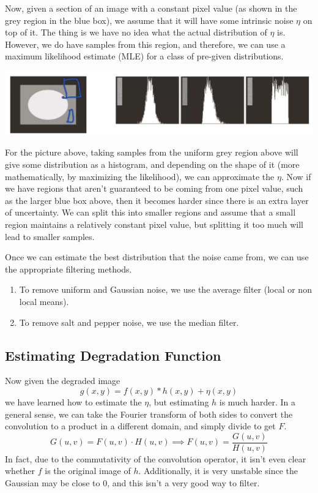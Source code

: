 \documentclass{article}
\begin{document}
    Now, given a section of an image with a constant pixel value (as shown in the grey region in the blue box), we assume that it will have some intrinsic noise $\eta$ on top of it. The thing is we have no idea what the actual distribution of $\eta$ is. However, we do have samples from this region, and therefore, we can use a maximum likelihood estimate (MLE) for a class of pre-given distributions. 
    \begin{center}
        \includegraphics[scale=0.2]{img/hist_estimate.png}
    \end{center}
    For the picture above, taking samples from the uniform grey region above will give some distribution as a histogram, and depending on the shape of it (more mathematically, by maximizing the likelihood), we can approximate the $\eta$. Now if we have regions that aren't guaranteed to be coming from one pixel value, such as the larger blue box above, then it becomes harder since there is an extra layer of uncertainty. We can split this into smaller regions and assume that a small region maintains a relatively constant pixel value, but splitting it too much will lead to smaller samples. 

    Once we can estimate the best distribution that the noise came from, we can use the appropriate filtering methods. 
    \begin{enumerate}
        \item To remove uniform and Gaussian noise, we use the average filter (local or non local means). 
        \item To remove salt and pepper noise, we use the median filter. 
    \end{enumerate}

  \subsection{Estimating Degradation Function}

    Now given the degraded image 
    \[g(x, y) = f(x, y) \ast h(x, y) + \eta(x, y)\]
    we have learned how to estimate the $\eta$, but estimating $h$ is much harder. In a general sense, we can take the Fourier transform of both sides to convert the convolution to a product in a different domain, and simply divide to get $F$. 
    \[G(u, v) = F(u, v) \cdot H(u, v) \implies F(u, v) = \frac{G(u, v)}{H(u, v)}\]
    In fact, due to the commutativity of the convolution operator, it isn't even clear whether $f$ is the original image of $h$. Additionally, it is very unstable since the Gaussian may be close to $0$, and this isn't a very good way to filter. 
\end{document}
